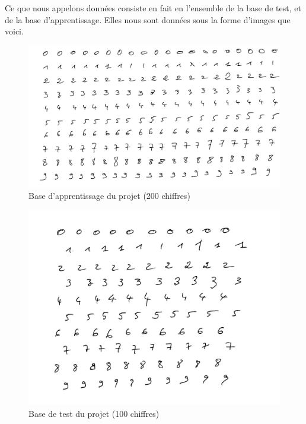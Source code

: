 Ce que nous appelons données consiste en fait en l'ensemble de la
base de test, et de la base d'apprentissage. Elles nous sont 
données sous la forme d'images que voici.

\begin{figure}[!h]
\centering
\includegraphics[scale=0.5]{app.jpg}
\caption{Base d'apprentissage du projet (200 chiffres)}
\end{figure}

\begin{figure}[!h]
\centering
\includegraphics[scale=0.5]{test.jpg}
\caption{Base de test du projet (100 chiffres)}
\end{figure}
